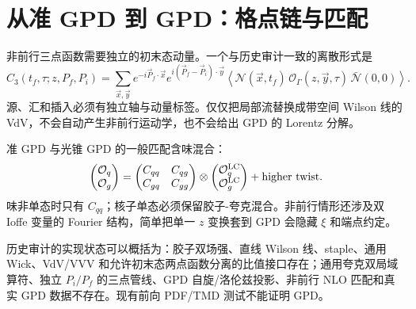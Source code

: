 \section{从准 GPD 到 GPD：格点链与匹配}

非前行三点函数需要独立的初末态动量。一个与历史审计一致的离散形式是
\begin{equation}
  C_3(t_f,\tau;z,P_f,P_i)
  =\sum_{\vec x,\vec y}
  e^{-i\vec P_f\cdot\vec x}
  e^{i(\vec P_f-\vec P_i)\cdot\vec y}
  \left\langle
  \mathcal N(\vec x,t_f)\,
  \mathcal O_\Gamma(z,\vec y,\tau)\,
  \bar{\mathcal N}(0,0)
  \right\rangle.
  \label{eq:b07-gpd3pt}
\end{equation}
源、汇和插入必须有独立轴与动量标签。仅仅把局部流替换成带空间 Wilson 线的 VdV，不会自动产生非前行运动学，也不会给出 GPD 的 Lorentz 分解。

准 GPD 与光锥 GPD 的一般匹配含味混合：
\begin{equation}
  \begin{pmatrix}\mathcal O_q\\ \mathcal O_g\end{pmatrix}
  =\begin{pmatrix}
  C_{qq}&C_{qg}\\ C_{gq}&C_{gg}
  \end{pmatrix}
  \otimes
  \begin{pmatrix}\mathcal O_q^{\rm LC}\\ \mathcal O_g^{\rm LC}\end{pmatrix}
  +\text{higher twist}.
  \label{eq:b07-gpdmatching}
\end{equation}
味非单态时只有 $C_{qq}$；核子单态必须保留胶子-夸克混合。非前行情形还涉及双 Ioffe 变量的 Fourier 结构，简单把单一 $z$ 变换套到 GPD 会隐藏 $\xi$ 和端点约定。

历史审计的实现状态可以概括为：胶子双场强、直线 Wilson 线、staple、通用 Wick、VdV/VVV 和允许初末态两点函数分离的比值接口存在；通用夸克双局域算符、独立 $P_i/P_f$ 的三点管线、GPD 自旋/洛伦兹投影、非前行 NLO 匹配和真实 GPD 数据不存在。现有前向 PDF/TMD 测试不能证明 GPD。


